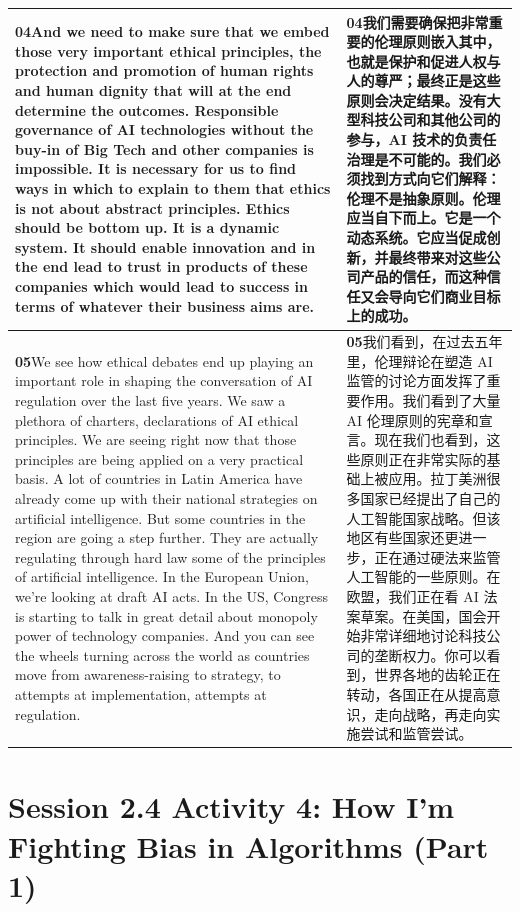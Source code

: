 \documentclass[UTF8,zihao=-4,fontset=fandol]{ctexart}
\newcommand{\TranscriptColumn}{\raggedright\arraybackslash\hyphenpenalty=10000\exhyphenpenalty=10000\sloppy}
\begin{document}
\begin{longtable}{>{\TranscriptColumn}p{} >{\TranscriptColumn}p{}}
\textbf{04}\quad And we need to make sure that we embed those very important ethical principles, the protection and promotion of human rights and human dignity that will at the end determine the outcomes. Responsible governance of AI technologies without the buy-in of Big Tech and other companies is impossible. It is necessary for us to find ways in which to explain to them that ethics is not about abstract principles. Ethics should be bottom up. It is a dynamic system. It should enable innovation and in the end lead to trust in products of these companies which would lead to success in terms of whatever their business aims are. & \textbf{04}\quad 我们需要确保把非常重要的伦理原则嵌入其中，也就是保护和促进人权与人的尊严；最终正是这些原则会决定结果。没有大型科技公司和其他公司的参与，AI 技术的负责任治理是不可能的。我们必须找到方式向它们解释：伦理不是抽象原则。伦理应当自下而上。它是一个动态系统。它应当促成创新，并最终带来对这些公司产品的信任，而这种信任又会导向它们商业目标上的成功。 \\ \hline
\textbf{05}\quad We see how ethical debates end up playing an important role in shaping the conversation of AI regulation over the last five years. We saw a plethora of charters, declarations of AI ethical principles. We are seeing right now that those principles are being applied on a very practical basis. A lot of countries in Latin America have already come up with their national strategies on artificial intelligence. But some countries in the region are going a step further. They are actually regulating through hard law some of the principles of artificial intelligence. In the European Union, we're looking at draft AI acts. In the US, Congress is starting to talk in great detail about monopoly power of technology companies. And you can see the wheels turning across the world as countries move from awareness-raising to strategy, to attempts at implementation, attempts at regulation. & \textbf{05}\quad 我们看到，在过去五年里，伦理辩论在塑造 AI 监管的讨论方面发挥了重要作用。我们看到了大量 AI 伦理原则的宪章和宣言。现在我们也看到，这些原则正在非常实际的基础上被应用。拉丁美洲很多国家已经提出了自己的人工智能国家战略。但该地区有些国家还更进一步，正在通过硬法来监管人工智能的一些原则。在欧盟，我们正在看 AI 法案草案。在美国，国会开始非常详细地讨论科技公司的垄断权力。你可以看到，世界各地的齿轮正在转动，各国正在从提高意识，走向战略，再走向实施尝试和监管尝试。 \\ \hline
\end{longtable}


\clearpage
\section{Session 2.4 Activity 4: How I'm Fighting Bias in Algorithms (Part 1)}
\end{document}
